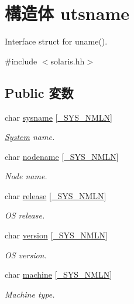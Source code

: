 \hypertarget{structSolaris_1_1utsname}{
\section{構造体 utsname}
\label{structSolaris_1_1utsname}
}


Interface struct for uname().  


{\ttfamily \#include $<$solaris.hh$>$}\subsection*{Public 変数}
\begin{DoxyCompactItemize}
\item 
char \hyperlink{structSolaris_1_1utsname_a2deb62088193f0a1a1c7169961ef9417}{sysname} \mbox{[}\hyperlink{classSolaris_a1a19d4c9718c9a4ad5fa2e48271fccc9}{\_\-SYS\_\-NMLN}\mbox{]}
\begin{DoxyCompactList}\small\item\em \hyperlink{classSystem}{System} name. \item\end{DoxyCompactList}\item 
char \hyperlink{structSolaris_1_1utsname_a3e8872e682806e061de2b1ee07bc75f3}{nodename} \mbox{[}\hyperlink{classSolaris_a1a19d4c9718c9a4ad5fa2e48271fccc9}{\_\-SYS\_\-NMLN}\mbox{]}
\begin{DoxyCompactList}\small\item\em Node name. \item\end{DoxyCompactList}\item 
char \hyperlink{structSolaris_1_1utsname_a4015ecb9ca3fd601ff8b8961eda3e7e2}{release} \mbox{[}\hyperlink{classSolaris_a1a19d4c9718c9a4ad5fa2e48271fccc9}{\_\-SYS\_\-NMLN}\mbox{]}
\begin{DoxyCompactList}\small\item\em OS release. \item\end{DoxyCompactList}\item 
char \hyperlink{structSolaris_1_1utsname_a1e88526d3e96aa25d88df1541dafe922}{version} \mbox{[}\hyperlink{classSolaris_a1a19d4c9718c9a4ad5fa2e48271fccc9}{\_\-SYS\_\-NMLN}\mbox{]}
\begin{DoxyCompactList}\small\item\em OS version. \item\end{DoxyCompactList}\item 
char \hyperlink{structSolaris_1_1utsname_a0687759450f1b8396e8e9415abe4b867}{machine} \mbox{[}\hyperlink{classSolaris_a1a19d4c9718c9a4ad5fa2e48271fccc9}{\_\-SYS\_\-NMLN}\mbox{]}
\begin{DoxyCompactList}\small\item\em Machine type. \item\end{DoxyCompactList}\end{DoxyCompactItemize}


